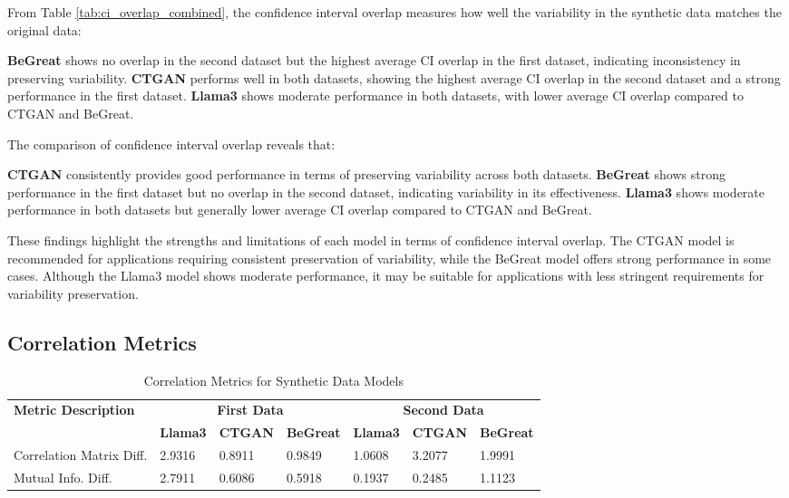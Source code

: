 From Table \ref{tab:ci_overlap_combined}, the confidence interval overlap measures how well the variability in the synthetic data matches the original data:

\textbf{BeGreat} shows no overlap in the second dataset but the highest average CI overlap in the first dataset, indicating inconsistency in preserving variability.
\textbf{CTGAN} performs well in both datasets, showing the highest average CI overlap in the second dataset and a strong performance in the first dataset.
\textbf{Llama3} shows moderate performance in both datasets, with lower average CI overlap compared to CTGAN and BeGreat.

\vspace{0.5cm}

The comparison of confidence interval overlap reveals that:

\textbf{CTGAN} consistently provides good performance in terms of preserving variability across both datasets.
\textbf{BeGreat} shows strong performance in the first dataset but no overlap in the second dataset, indicating variability in its effectiveness.
\textbf{Llama3} shows moderate performance in both datasets but generally lower average CI overlap compared to CTGAN and BeGreat.

\vspace{0.5cm}

These findings highlight the strengths and limitations of each model in terms of confidence interval overlap. The CTGAN model is recommended for applications requiring consistent preservation of variability, while the BeGreat model offers strong performance in some cases. Although the Llama3 model shows moderate performance, it may be suitable for applications with less stringent requirements for variability preservation.





\subsection{Correlation Metrics}

\begin{table}[H]
\centering
\caption{Correlation Metrics for Synthetic Data Models}
\label{tab:correlation_metrics_combined}
\begin{tabularx}{\textwidth}{l*{6}{X}}
    \toprule
    \textbf{Metric Description} & \multicolumn{3}{c}{\textbf{First Data}} & \multicolumn{3}{c}{\textbf{Second Data}} \\
    \cmidrule(lr){2-4} \cmidrule(lr){5-7}
    & \textbf{Llama3} & \textbf{CTGAN} & \textbf{BeGreat} & \textbf{Llama3} & \textbf{CTGAN} & \textbf{BeGreat} \\
    \midrule
    Correlation Matrix Diff. & 2.9316 & 0.8911 & 0.9849 & 1.0608 & 3.2077 & 1.9991 \\
    Mutual Info. Diff. & 2.7911 & 0.6086 & 0.5918 & 0.1937 & 0.2485 & 1.1123 \\
    \bottomrule
\end{tabularx}
\end{table}





